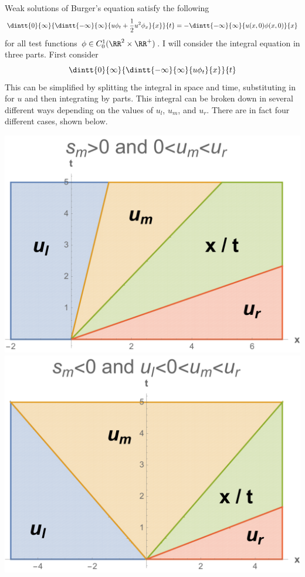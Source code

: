 \documentclass[11pt, oneside]{article}
\begin{document}
\begin{enumerate}
    Weak solutions of Burger's equation satisfy the following
    \[
      \dintt{0}{\infty}{\dintt{-\infty}{\infty}{u \phi_t + \frac{1}{2} u^2 \phi_x}{x}}{t} = -\dintt{-\infty}{\infty}{u(x, 0)\phi(x, 0)}{x}
    \]
    for all test functions $\phi \in C^{1}_0(\RR^2 \times \RR^+)$.
    I will consider the integral equation in three parts.
    First consider
    \[
      \dintt{0}{\infty}{\dintt{-\infty}{\infty}{u \phi_t}{x}}{t}
    \]
    This can be simplified by splitting the integral in space and time,
    substituting in for $u$ and then integrating by parts.
    This integral can be broken down in several different ways depending on the
    values of $u_l$, $u_m$, and $u_r$.
    There are in fact four different cases, shown below.
    \begin{center}
      \includegraphics[scale=.30]{Figures/01_03.pdf}
      \includegraphics[scale=.30]{Figures/01_04.pdf}

\end{center}
\end{enumerate}
\end{document}
